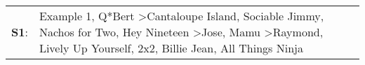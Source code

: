 \begin{supertabular}{p{0.03\textwidth}p{0.92\textwidth}}
 \textbf{S1}:  &  Example 1\textsuperscript{}, \enspace Q*Bert\textsuperscript{} \textgreater \enspace Cantaloupe Island\textsuperscript{}, \enspace Sociable Jimmy\textsuperscript{}, \enspace Nachos for Two\textsuperscript{}, \enspace Hey Nineteen\textsuperscript{} \textgreater \enspace Jose\textsuperscript{}, \enspace Mamu\textsuperscript{} \textgreater \enspace Raymond\textsuperscript{}, \enspace Lively Up Yourself\textsuperscript{}, \enspace 2x2\textsuperscript{}, \enspace Billie Jean\textsuperscript{}, \enspace All Things Ninja\textsuperscript{}  \enspace  \\
\end{supertabular}
